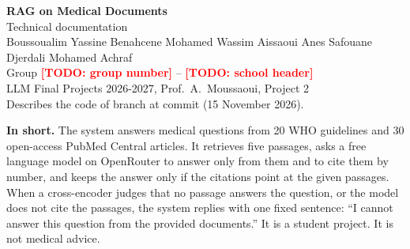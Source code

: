 \documentclass[10pt,a4paper]{article}
\newcommand{\TODO}[1]{\textcolor{red}{\textbf{[TODO: #1]}}}
\newcommand{\code}[1]{\texttt{\detokenize{#1}}}
\begin{document}
\begin{center}
  {\LARGE\bfseries RAG on Medical Documents}\\[0.4em]
  {\Large Technical documentation}\\[0.8em]
  Boussoualim Yassine \quad Benahcene Mohamed Wassim \quad Aissaoui Anes Safouane \quad Djerdali Mohamed Achraf\\[0.3em]
  Group \TODO{group number} \quad -- \quad \TODO{school header}\\
  LLM Final Projects 2026-2027, Prof.\ A.\ Moussaoui, Project 2\\[0.3em]
  {\small Describes the code of branch \code{eval-prep} at commit \code{98ad7c7} (15 November 2026).}
\end{center}

\noindent\textbf{In short.} The system answers medical questions from 20 WHO guidelines and 30 open-access
PubMed Central articles. It retrieves five passages, asks a free language model on OpenRouter to answer
only from them and to cite them by number, and keeps the answer only if the citations point at the
given passages. When a cross-encoder judges that no passage answers the question, or the model does
not cite the passages, the system replies with one fixed sentence:
``I cannot answer this question from the provided documents.''
It is a student project. It is not medical advice.











\end{document}
